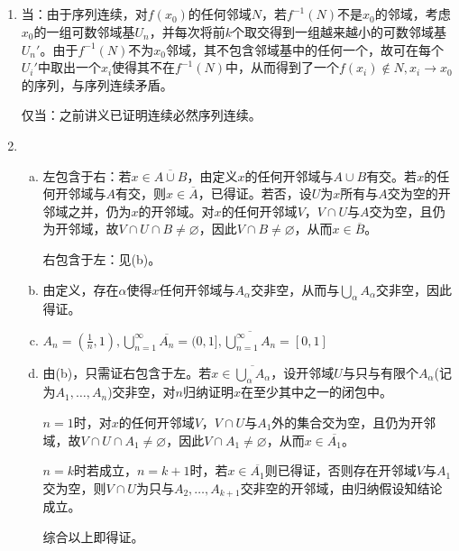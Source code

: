 \documentclass[a4paper,UTF8,fontset=windows]{ctexart}
\begin{document}
\subsection{}
\begin{enumerate}[(1)]
    \item
    当：由于序列连续，对$f(x_0)$的任何邻域$N$，若$f^{-1}(N)$不是$x_0$的邻域，考虑$x_0$的一组可数邻域基$U_n$，并每次将前$k$个取交得到一组越来越小的可数邻域基$U_n'$。由于$f^{-1}(N)$不为$x_0$邻域，其不包含邻域基中的任何一个，故可在每个$U_i'$中取出一个$x_i$使得其不在$f^{-1}(N)$中，从而得到了一个$f(x_i)\notin N,x_i\to x_0$的序列，与序列连续矛盾。
    
    仅当：之前讲义已证明连续必然序列连续。
    
    \item
    \begin{enumerate}[(a)]
    \item
    左包含于右：若$x\in\overline{A\cup B}$，由定义$x$的任何开邻域与$A\cup B$有交。若$x$的任何开邻域与$A$有交，则$x\in\overline{A}$，已得证。若否，设$U$为$x$所有与$A$交为空的开邻域之并，仍为$x$的开邻域。对$x$的任何开邻域$V$，$V\cap U$与$A$交为空，且仍为开邻域，故$V\cap U\cap B\ne\varnothing$，因此$V\cap B\ne\varnothing$，从而$x\in\overline{B}$。
    
    右包含于左：见(b)。
    
    \item
    由定义，存在$\alpha$使得$x$任何开邻域与$A_\alpha$交非空，从而与$\bigcup_\alpha A_\alpha$交非空，因此得证。
    
    \item
    $A_n=(\frac{1}{n},1),\bigcup_{n=1}^\infty\overline{A_n}=(0,1],\overline{\bigcup_{n=1}^\infty A_n}=[0,1]$
    
    \item
    由(b)，只需证右包含于左。若$x\in\overline{\bigcup_\alpha A_\alpha}$，设开邻域$U$与只与有限个$A_\alpha$(记为$A_1,\dots,A_n$)交非空，对$n$归纳证明$x$在至少其中之一的闭包中。
    
    $n=1$时，对$x$的任何开邻域$V$，$V\cap U$与$A_1$外的集合交为空，且仍为开邻域，故$V\cap U\cap A_1\ne\varnothing$，因此$V\cap A_1\ne\varnothing$，从而$x\in\overline{A_1}$。
    
    $n=k$时若成立，$n=k+1$时，若$x\in\overline{A_1}$则已得证，否则存在开邻域$V$与$A_1$交为空，则$V\cap U$为只与$A_2,\dots,A_{k+1}$交非空的开邻域，由归纳假设知结论成立。
    
    综合以上即得证。
    \end{enumerate}
    

\end{enumerate}
\end{document}
